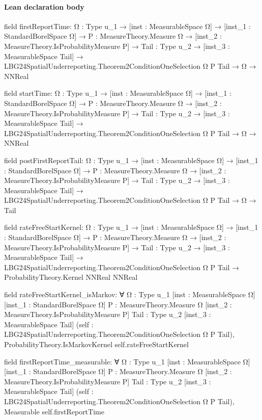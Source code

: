 \documentclass[10pt]{article}
\begin{document}
\paragraph{Lean declaration body}
\begin{ReviewVerbatim}
field firstReportTime:
{Ω : Type u_1} →
  [inst : MeasurableSpace Ω] →
    [inst_1 : StandardBorelSpace Ω] →
      {P : MeasureTheory.Measure Ω} →
        [inst_2 : MeasureTheory.IsProbabilityMeasure P] →
          {Tail : Type u_2} →
            [inst_3 : MeasurableSpace Tail] →
              LBG24SpatialUnderreporting.Theorem2ConditionOneSelection Ω P Tail → Ω → NNReal

field startTime:
{Ω : Type u_1} →
  [inst : MeasurableSpace Ω] →
    [inst_1 : StandardBorelSpace Ω] →
      {P : MeasureTheory.Measure Ω} →
        [inst_2 : MeasureTheory.IsProbabilityMeasure P] →
          {Tail : Type u_2} →
            [inst_3 : MeasurableSpace Tail] →
              LBG24SpatialUnderreporting.Theorem2ConditionOneSelection Ω P Tail → Ω → NNReal

field postFirstReportTail:
{Ω : Type u_1} →
  [inst : MeasurableSpace Ω] →
    [inst_1 : StandardBorelSpace Ω] →
      {P : MeasureTheory.Measure Ω} →
        [inst_2 : MeasureTheory.IsProbabilityMeasure P] →
          {Tail : Type u_2} →
            [inst_3 : MeasurableSpace Tail] →
              LBG24SpatialUnderreporting.Theorem2ConditionOneSelection Ω P Tail → Ω → Tail

field rateFreeStartKernel:
{Ω : Type u_1} →
  [inst : MeasurableSpace Ω] →
    [inst_1 : StandardBorelSpace Ω] →
      {P : MeasureTheory.Measure Ω} →
        [inst_2 : MeasureTheory.IsProbabilityMeasure P] →
          {Tail : Type u_2} →
            [inst_3 : MeasurableSpace Tail] →
              LBG24SpatialUnderreporting.Theorem2ConditionOneSelection Ω P Tail → ProbabilityTheory.Kernel NNReal NNReal

field rateFreeStartKernel_isMarkov:
∀ {Ω : Type u_1} [inst : MeasurableSpace Ω] [inst_1 : StandardBorelSpace Ω] {P : MeasureTheory.Measure Ω}
  [inst_2 : MeasureTheory.IsProbabilityMeasure P] {Tail : Type u_2} [inst_3 : MeasurableSpace Tail]
  (self : LBG24SpatialUnderreporting.Theorem2ConditionOneSelection Ω P Tail),
  ProbabilityTheory.IsMarkovKernel self.rateFreeStartKernel

field firstReportTime_measurable:
∀ {Ω : Type u_1} [inst : MeasurableSpace Ω] [inst_1 : StandardBorelSpace Ω] {P : MeasureTheory.Measure Ω}
  [inst_2 : MeasureTheory.IsProbabilityMeasure P] {Tail : Type u_2} [inst_3 : MeasurableSpace Tail]
  (self : LBG24SpatialUnderreporting.Theorem2ConditionOneSelection Ω P Tail), Measurable self.firstReportTime


\end{ReviewVerbatim}
\end{document}
